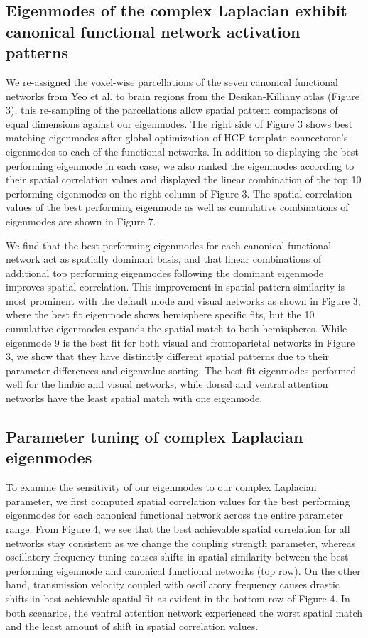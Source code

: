 \documentclass{article}
\begin{document}
\subsection{Eigenmodes of the complex Laplacian exhibit canonical functional network activation patterns}
We re-assigned the voxel-wise parcellations of the seven canonical functional networks from Yeo et al. \cite{Yeo2011} to brain regions from the Desikan-Killiany atlas (Figure 3), this re-sampling of the parcellations allow spatial pattern comparisons of equal dimensions against our eigenmodes. The right side of Figure 3 shows best matching eigenmodes after global optimization of HCP template connectome's eigenmodes to each of the functional networks. In addition to displaying the best performing eigenmode in each case, we also ranked the eigenmodes according to their spatial correlation values and displayed the linear combination of the top 10 performing eigenmodes on the right column of Figure 3. The spatial correlation values of the best performing eigenmode as well as cumulative combinations of eigenmodes are shown in Figure 7.

We find that the best performing eigenmodes for each canonical functional network act as spatially dominant basis, and that linear combinations of additional top performing eigenmodes following the dominant eigenmode improves spatial correlation. This improvement in spatial pattern similarity is most prominent with the default mode and visual networks as shown in Figure 3, where the best fit eigenmode shows hemisphere specific fits, but the 10 cumulative eigenmodes expands the spatial match to both hemispheres. While eigenmode 9 is the best fit for both visual and frontoparietal networks in Figure 3, we show that they have distinctly different spatial patterns due to their parameter differences and eigenvalue sorting. The best fit eigenmodes performed well for the limbic and visual networks, while dorsal and ventral attention networks have the least spatial match with one eigenmode. 

\subsection{Parameter tuning of complex Laplacian eigenmodes}
To examine the sensitivity of our eigenmodes to our complex Laplacian parameter, we first computed spatial correlation values for the best performing eigenmodes for each canonical functional network across the entire parameter range. From Figure 4, we see that the best achievable spatial correlation for all networks stay consistent as we change the coupling strength parameter, whereas oscillatory frequency tuning causes shifts in spatial similarity between the best performing eigenmode and canonical functional networks (top row). On the other hand, transmission velocity coupled with oscillatory frequency causes drastic shifts in best achievable spatial fit as evident in the bottom row of Figure 4. In both scenarios, the ventral attention network experienced the worst spatial match and the least amount of shift in spatial correlation values. 
\end{document}
